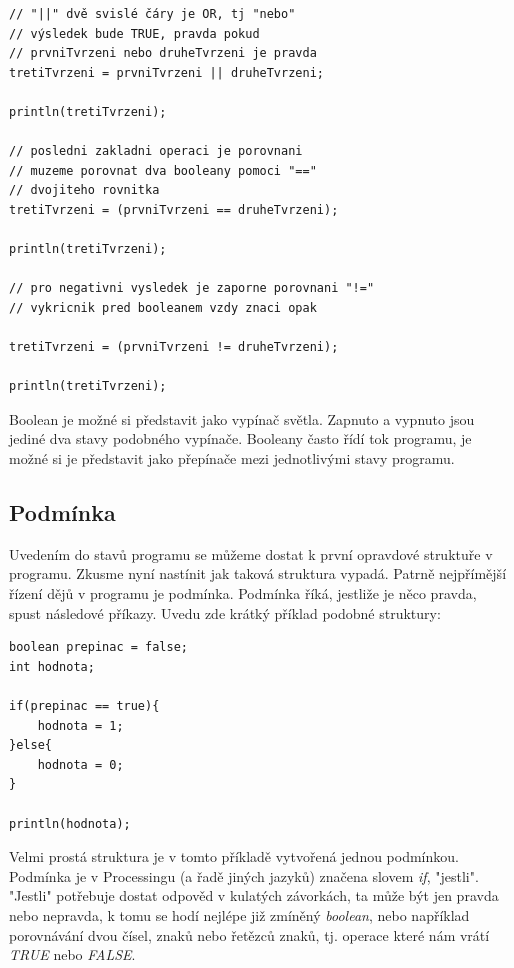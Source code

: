 \documentclass[11pt]{article}
\begin{document}
\begin{itemize}
\begin{lstlisting}
// "||" dvě svislé čáry je OR, tj "nebo"
// výsledek bude TRUE, pravda pokud
// prvniTvrzeni nebo druheTvrzeni je pravda
tretiTvrzeni = prvniTvrzeni || druheTvrzeni;

println(tretiTvrzeni);

// posledni zakladni operaci je porovnani
// muzeme porovnat dva booleany pomoci "=="
// dvojiteho rovnitka
tretiTvrzeni = (prvniTvrzeni == druheTvrzeni);

println(tretiTvrzeni);

// pro negativni vysledek je zaporne porovnani "!="
// vykricnik pred booleanem vzdy znaci opak

tretiTvrzeni = (prvniTvrzeni != druheTvrzeni);

println(tretiTvrzeni);

\end{lstlisting}

Boolean je možné si představit jako vypínač světla. Zapnuto a vypnuto jsou jediné dva stavy podobného vypínače. Booleany často řídí tok programu, je možné si je představit jako přepínače mezi jednotlivými stavy programu.

\end{itemize}

\subsection{Podmínka}

Uvedením do stavů programu se můžeme dostat k první opravdové struktuře v programu. Zkusme nyní nastínit jak taková struktura vypadá. Patrně nejpřímější řízení dějů v programu je podmínka. Podmínka říká, jestliže je něco pravda, spust následové příkazy. Uvedu zde krátký příklad podobné struktury:

\begin{lstlisting}
boolean prepinac = false;
int hodnota;

if(prepinac == true){
    hodnota = 1;
}else{
    hodnota = 0;
}

println(hodnota);

\end{lstlisting}

Velmi prostá struktura je v tomto příkladě vytvořená jednou podmínkou. Podmínka je v Processingu (a řadě jiných jazyků) značena slovem {\em if}, "jestli". "Jestli" potřebuje dostat odpověd v kulatých závorkách, ta může být jen pravda nebo nepravda, k tomu se hodí nejlépe již zmíněný {\em boolean}, nebo například porovnávání dvou čísel, znaků nebo řetězců znaků, tj. operace které nám vrátí {\em TRUE} nebo {\em FALSE}.
\end{document}
